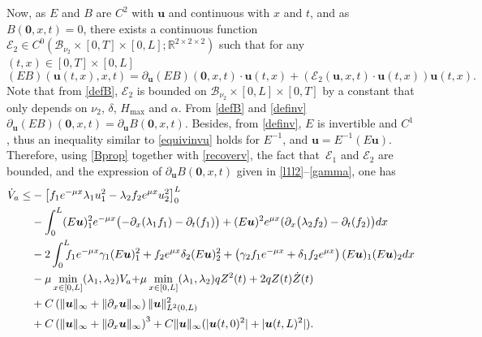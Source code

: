 \documentclass[JEP,XML,SOM,Unicode]{cedram}
\let\mathcal\mathscr
\theoremstyle{definition}
\begin{document}
Now, as $E$ and $B$ are $C^{2}$ with $\boldsymbol{u}$ and continuous with $x$ and $t$, and as $B(\boldsymbol{0},x,t)=0$, there exists a continuous function {$\mathcal{E}_{2}\in C^{0}(\mathcal{B}_{\nu_{2}}\times[0,T]\times[0,L];\mathbb{R}^{2\times 2\times 2})$} such that for any $(t,x)\in[0,T]\times[0,L]$
\begin{equation}
(EB)(\boldsymbol{u}(t,x),x,t)=\partial_{\boldsymbol{u}}(EB)(\boldsymbol{0},x,t)\cdot\boldsymbol{u}(t,x)+(\mathcal{E}_{2}(\boldsymbol{u},x,t)\cdot\boldsymbol{u}(t,x))\boldsymbol{u}(t,x).
\label{Bprop}
\end{equation}
Note that from \eqref{defB}, $\mathcal{E}_{2}$ is bounded on $\mathcal{B}_{\nu_{2}}\times[0,L]\times[0,T]$ by a constant that only depends on $\nu_{2}$, $\delta$, $H_{\max}$ and $\alpha$. From \eqref{defB} and \eqref{definv}
$\partial_{\boldsymbol{u}}(EB)(\boldsymbol{0},x,t)=\partial_{\boldsymbol{u}}B(\boldsymbol{0},x,t)$. Besides, from \eqref{definv}, $E$ is invertible and $C^{1}$, thus an inequality similar to
\eqref{equivinvu}
holds for $E^{-1}$, and $\boldsymbol{u}=E^{-1}(E\boldsymbol{u})$.
Therefore, using \eqref{Bprop} together with \eqref{recoverv}, {the fact that~$\mathcal{E}_{1}$ and $\mathcal{E}_{2}$ are bounded,} and the expression of $\partial_{\boldsymbol{u}}B(\boldsymbol{0},x,t)$ given in {\eqref{l1l2}}--\eqref{gamma}, one has
\begin{align*}
\dot V_{a}\leq& -\left[f_{1}e^{-\mu x}\lambda_{1}u_{1}^{2}-\lambda_{2}f_{2}e^{\mu x}u_{2}^{2}\right]_{0}^{L}\\
&-\int_{0}^{L}(E\boldsymbol{u})_{1}^{2}e^{-\mu x}\bigl(-\partial_{x}(\lambda_{1}f_{1})-\partial_{t}(f_{1})\bigr)+(E\boldsymbol{u})^{2}e^{\mu x}(\partial_{x}\bigl(\lambda_{2}f_{2})-\partial_{t}(f_{2})\bigr)dx\\
&-2\int_{0}^{L}\hspace*{-2mm}f_{1}e^{-\mu x}\gamma_{1}(E\boldsymbol{u})_{1}^{2}+f_{2}e^{\mu x}\delta_{2}(E\boldsymbol{u})_{2}^{2}+\left(\gamma_{2}f_{1}e^{-\mu x}+\delta_{1}f_{2}e^{\mu x}\right)(E\boldsymbol{u})_{1}(E\boldsymbol{u})_{2}dx\\
&-\mu\min\limits_{x\in[0,L]}(\lambda_{1},\lambda_{2})V_{a}{+\mu\min\limits_{x\in[0,L]}(\lambda_{1},\lambda_{2})qZ^{2}(t)}
+2qZ(t)\dot Z(t)\\
&+C\left(\lVert \boldsymbol{u}\rVert_{\infty}+\lVert \partial_{x} \boldsymbol{u}\rVert_{\infty}\right)\lVert\boldsymbol{u} \rVert_{L^{2}(0,L)}^{2}\\
&+C\left(\lVert \boldsymbol{u}\rVert_{\infty}+\lVert \partial_{x} \boldsymbol{u}\rVert_{\infty}\right)^{3}+C\lVert \boldsymbol{u}\rVert_{\infty}(|\boldsymbol{u}(t,0)^{2}|+|\boldsymbol{u}(t,L)^{2}|).
\end{align*}
\end{document}
